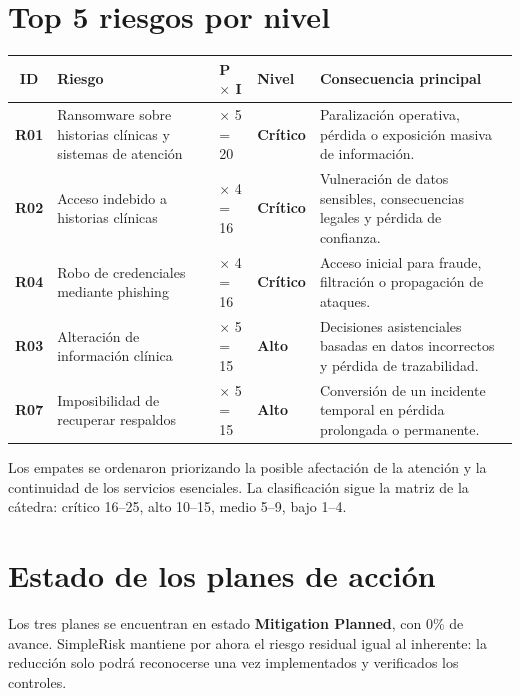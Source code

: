 \documentclass[10pt,a4paper]{article}
\begin{document}
\section*{Top 5 riesgos por nivel}

\small
\begin{tabularx}{\linewidth}{>{\bfseries}c X >{\centering\arraybackslash}m{1.6cm} >{\centering\arraybackslash}m{1.5cm} X}
\toprule
\textbf{ID} & \textbf{Riesgo} & \textbf{P $\times$ I} & \textbf{Nivel} & \textbf{Consecuencia principal}\\
\midrule
R01 & Ransomware sobre historias clínicas y sistemas de atención & 4 $\times$ 5 = 20 & \textcolor{critical}{\textbf{Crítico}} & Paralización operativa, pérdida o exposición masiva de información.\\
R02 & Acceso indebido a historias clínicas & 4 $\times$ 4 = 16 & \textcolor{critical}{\textbf{Crítico}} & Vulneración de datos sensibles, consecuencias legales y pérdida de confianza.\\
R04 & Robo de credenciales mediante phishing & 4 $\times$ 4 = 16 & \textcolor{critical}{\textbf{Crítico}} & Acceso inicial para fraude, filtración o propagación de ataques.\\
R03 & Alteración de información clínica & 3 $\times$ 5 = 15 & \textcolor{high}{\textbf{Alto}} & Decisiones asistenciales basadas en datos incorrectos y pérdida de trazabilidad.\\
R07 & Imposibilidad de recuperar respaldos & 3 $\times$ 5 = 15 & \textcolor{high}{\textbf{Alto}} & Conversión de un incidente temporal en pérdida prolongada o permanente.\\
\bottomrule
\end{tabularx}
\normalsize

\vspace{2mm}
{\small\color{muted}Los empates se ordenaron priorizando la posible afectación de la atención y la continuidad de los servicios esenciales. La clasificación sigue la matriz de la cátedra: crítico 16--25, alto 10--15, medio 5--9, bajo 1--4.}

\newpage

\section*{Estado de los planes de acción}

Los tres planes se encuentran en estado \textbf{Mitigation Planned}, con 0\% de avance. SimpleRisk mantiene por ahora el riesgo residual igual al inherente: la reducción solo podrá reconocerse una vez implementados y verificados los controles.
\end{document}
